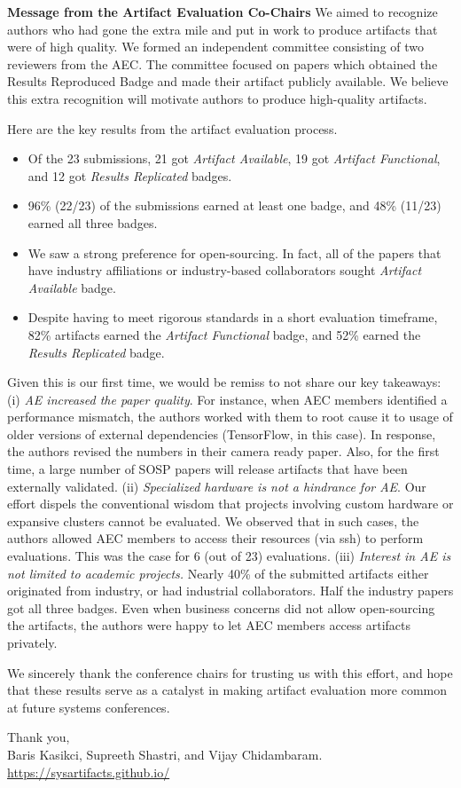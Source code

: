 \documentclass{letter}
\begin{document}
\begin{letter}{\large \bf {Message from the Artifact Evaluation Co-Chairs}}
We aimed to recognize authors who had gone the extra mile and put in work to produce artifacts that were of high quality. We formed an independent committee consisting of two reviewers from the AEC. The committee focused on papers which obtained the Results Reproduced Badge and made their artifact publicly available. We believe this extra recognition will motivate authors to produce high-quality artifacts. 

Here are the key results from the artifact evaluation process.
\vspace{-2mm}
\begin{itemize}
\setlength\itemsep{1mm}
\item Of the 23 submissions, 21 got \emph{Artifact Available}, 19 got \emph{Artifact Functional}, and 12 got \emph{Results Replicated} badges. 
\item 96\% (22/23) of the submissions earned at least one badge, and 48\% (11/23) earned all three badges.
\item We saw a strong preference for open-sourcing. In fact, all of the papers that have industry affiliations or industry-based collaborators sought \emph{Artifact Available} badge.
\item Despite having to meet rigorous standards in a short evaluation timeframe, 82\% artifacts earned the \emph{Artifact Functional} badge, and 52\% earned the \emph{Results Replicated} badge.
\end{itemize}
 
Given this is our first time, we would be remiss to not share our key takeaways: (i) \emph{AE increased the paper quality}. For instance, when AEC members identified a performance mismatch, the authors worked with them to root cause it to usage of older versions of external dependencies (TensorFlow, in this case). In response, the authors revised the numbers in their camera ready paper. Also, for the first time, a large number of SOSP papers will release artifacts that have been externally validated. (ii) \emph{Specialized hardware is not a hindrance for AE}. Our effort dispels the conventional wisdom that projects involving custom hardware or expansive clusters cannot be evaluated. We observed that in such cases, the authors allowed AEC members to access their resources (via ssh) to perform evaluations. This was the case for 6 (out of 23) evaluations. (iii) \emph{Interest in AE is not limited to academic projects.} Nearly 40\% of the submitted artifacts either originated from industry, or had industrial collaborators. Half the industry papers got all three badges. Even when business concerns did not allow open-sourcing the artifacts, the authors were happy to let AEC members access artifacts privately. 

We sincerely thank the conference chairs for trusting us with this effort, and hope that these results serve as a catalyst in making artifact evaluation more common at future systems conferences. 

Thank you,\\
Baris Kasikci, Supreeth Shastri, and Vijay Chidambaram.\\
\url{https://sysartifacts.github.io/}

\end{letter}
\end{document}
